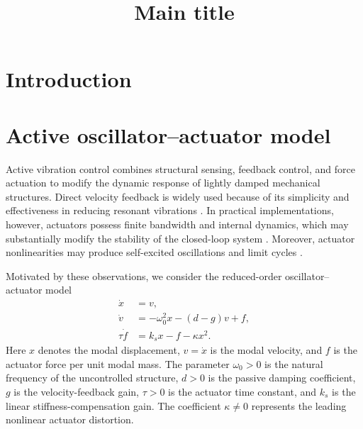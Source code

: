 \documentclass[11pt,reqno]{amsart}
\title[title]{Main title}
\theoremstyle{plain}
\theoremstyle{definition}
\theoremstyle{remark}
\begin{document}
\begin{abstract}

\end{abstract}


\maketitle


\section{Introduction}

\section{Active oscillator--actuator model}
\label{sec:active-oscillator-actuator}

Active vibration control combines structural sensing, feedback control,
and force actuation to modify the dynamic response of lightly damped
mechanical structures. Direct velocity feedback is widely used because of
its simplicity and effectiveness in reducing resonant vibrations
\cite{balas1979direct,preumont2002vibration,hirschfeldt2025compensated}.
In practical implementations, however, actuators possess finite bandwidth
and internal dynamics, which may substantially modify the stability of the
closed-loop system \cite{goh1985stability}. Moreover, actuator nonlinearities
may produce self-excited oscillations and limit cycles
\cite{dal2020active}.

Motivated by these observations, we consider the reduced-order
oscillator--actuator model
\begin{equation}
\label{eq:model}
\begin{aligned}
\dot x
&=
v,
\\
\dot v
&=
-\omega_0^2x-(d-g)v+f,
\\
\tau\dot f
&=
k_sx-f-\kappa x^2.
\end{aligned}
\end{equation}
Here \(x\) denotes the modal displacement, \(v=\dot x\) is the modal
velocity, and \(f\) is the actuator force per unit modal mass. The
parameter \(\omega_0>0\) is the natural frequency of the uncontrolled
structure, \(d>0\) is the passive damping coefficient, \(g\) is the
velocity-feedback gain, \(\tau>0\) is the actuator time constant, and
\(k_s\) is the linear stiffness-compensation gain. The coefficient
\(\kappa\neq0\) represents the leading nonlinear actuator distortion.
\end{document}
